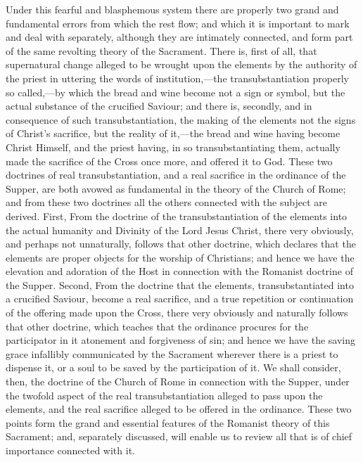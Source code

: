 \documentclass[]{book}
\begin{document}
Under this fearful and blasphemous system there are properly two grand and fundamental errors from which the rest flow; and which it is important to mark and deal with separately, although they are intimately connected, and form part of the same revolting theory of the Sacrament. There is, first of all, that supernatural change alleged to be wrought upon the elements by the authority of the priest in uttering the words of institution,---the transubstantiation properly so called,---by which the bread and wine become not a sign or symbol, but the actual substance of the crucified Saviour; and there is, secondly, and in consequence of such transubstantiation, the making of the elements not the signs of Christ's sacrifice, but the reality of it,---the bread and wine having become Christ Himself, and the priest having, in so transubstantiating them, actually made the sacrifice of the Cross once more, and offered it to God. These two doctrines of real transubstantiation, and a real sacrifice in the ordinance of the Supper, are both avowed as fundamental in the theory of the Church of Rome; and from these two doctrines all the others connected with the subject are derived. First, From the doctrine of the transubstantiation of the elements into the actual humanity and Divinity of the Lord Jesus Christ, there very obviously, and perhaps not unnaturally, follows that other doctrine, which declares that the elements are proper objects for the worship of Christians; and hence we have the elevation and adoration of the Host in connection with the Romanist doctrine of the Supper. Second, From the doctrine that the elements, transubstantiated into a crucified Saviour, become a real sacrifice, and a true repetition or continuation of the offering made upon the Cross, there very obviously and naturally follows that other doctrine, which teaches that the ordinance procures for the participator in it atonement and forgiveness of sin; and hence we have the saving grace infallibly communicated by the Sacrament wherever there is a priest to dispense it, or a soul to be saved by the participation of it. We shall consider, then, the doctrine of the Church of Rome in connection with the Supper, under the twofold aspect of the real transubstantiation alleged to pass upon the elements, and the real sacrifice alleged to be offered in the ordinance. These two points form the grand and essential features of the Romanist theory of this Sacrament; and, separately discussed, will enable us to review all that is of chief importance connected with it.
\end{document}

